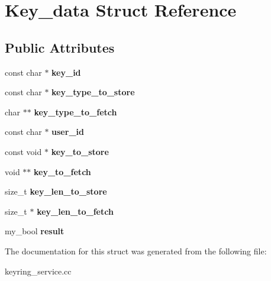 \hypertarget{structKey__data}{}\section{Key\+\_\+data Struct Reference}
\label{structKey__data}
\subsection*{Public Attributes}
\begin{DoxyCompactItemize}
\item 
\mbox{\label{structKey__data_abf9d579d1bc283e744ace111319e73b5}} 
const char $\ast$ {\bfseries key\+\_\+id}
\item 
\mbox{\label{structKey__data_a7c65c7eb63b39cd3de45564668c95c58}} 
const char $\ast$ {\bfseries key\+\_\+type\+\_\+to\+\_\+store}
\item 
\mbox{\label{structKey__data_a24f91aa24128f52e196bc875baa26a82}} 
char $\ast$$\ast$ {\bfseries key\+\_\+type\+\_\+to\+\_\+fetch}
\item 
\mbox{\label{structKey__data_a08d7b6e67df4d1be696f0071116af229}} 
const char $\ast$ {\bfseries user\+\_\+id}
\item 
\mbox{\label{structKey__data_a3aab1ba43e4bf1d0db1742eb9fe99e0a}} 
const void $\ast$ {\bfseries key\+\_\+to\+\_\+store}
\item 
\mbox{\label{structKey__data_a9a8f22774d6ab8d197363782155af303}} 
void $\ast$$\ast$ {\bfseries key\+\_\+to\+\_\+fetch}
\item 
\mbox{\label{structKey__data_a439018fd440fdf6226477808c6cbe500}} 
size\+\_\+t {\bfseries key\+\_\+len\+\_\+to\+\_\+store}
\item 
\mbox{\label{structKey__data_a753a5af1a481f37ae4975a6499516484}} 
size\+\_\+t $\ast$ {\bfseries key\+\_\+len\+\_\+to\+\_\+fetch}
\item 
\mbox{\label{structKey__data_a227aa60a4aa3b2ac7ac78aad074f4836}} 
my\+\_\+bool {\bfseries result}
\end{DoxyCompactItemize}


The documentation for this struct was generated from the following file\+:\begin{DoxyCompactItemize}
\item 
keyring\+\_\+service.\+cc\end{DoxyCompactItemize}

